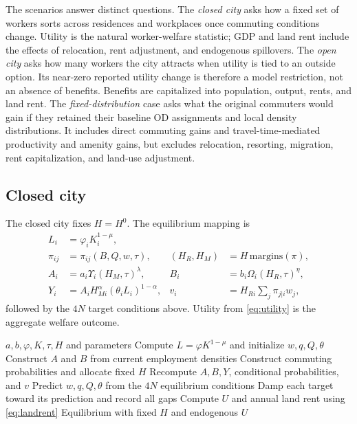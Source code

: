 \documentclass[11pt,a4paper]{article}
\begin{document}
The scenarios answer distinct questions. The \emph{closed city} asks how a
fixed set of workers sorts across residences and workplaces once commuting
conditions change. Utility is the natural worker-welfare statistic; GDP and
land rent include the effects of relocation, rent adjustment, and endogenous
spillovers. The \emph{open city} asks how many workers the city attracts when
utility is tied to an outside option. Its near-zero reported utility change is
therefore a model restriction, not an absence of benefits. Benefits are
capitalized into population, output, rents, and land rent. The
\emph{fixed-distribution} case asks what the original commuters would gain if
they retained their baseline OD assignments and local density distributions.
It includes direct commuting gains and travel-time-mediated productivity and
amenity gains, but excludes relocation, resorting, migration, rent
capitalization, and land-use adjustment.

\subsection{Closed city}
The closed city fixes $H=H^0$. The equilibrium mapping is
\begin{align}
 L_i&=\varphi_iK_i^{1-\mu},\\
 \pi_{ij}&=\pi_{ij}(B,Q,w,\tau),&
 (H_R,H_M)&=H\,\mathrm{margins}(\pi),\\
 A_i&=a_i\Upsilon_i(H_M,\tau)^\lambda,&
 B_i&=b_i\Omega_i(H_R,\tau)^\eta,\\
 Y_i&=A_iH_{Mi}^{\alpha}(\theta_iL_i)^{1-\alpha},&
 v_i&=H_{Ri}\sum_j\pi_{j|i}w_j,
\end{align}
followed by the $4N$ target conditions above. Utility from
\eqref{eq:utility} is the aggregate welfare outcome.

\begin{algorithm}[ht]
\caption{Closed-city equilibrium}
\begin{algorithmic}[1]
\Require $a,b,\varphi,K,\tau,H$ and parameters
\State Compute $L=\varphi K^{1-\mu}$ and initialize $w,q,Q,\theta$
 \State Construct $A$ and $B$ from current employment densities
 \State Construct commuting probabilities and allocate fixed $H$
 \State Recompute $A,B,Y$, conditional probabilities, and $v$
 \State Predict $w,q,Q,\theta$ from the $4N$ equilibrium conditions
 \State Damp each target toward its prediction and record all gaps
\EndWhile
\State Compute $U$ and annual land rent using \eqref{eq:landrent}
\Ensure Equilibrium with fixed $H$ and endogenous $U$
\end{algorithmic}
\end{algorithm}
\end{document}
